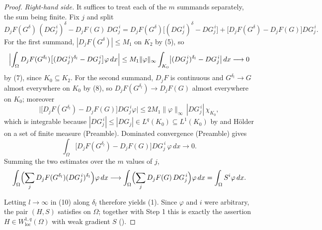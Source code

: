 \begin{proof}
\emph{Right-hand side.}  It suffices to treat each of the $m$ summands
separately, the sum being finite.  Fix $j$ and split
\[
D_jF(G^{\delta})\,(DG_j^{\,i})^{\delta}-D_jF(G)\,DG_j^{\,i}
=D_jF(G^{\delta})\bigl[(DG_j^{\,i})^{\delta}-DG_j^{\,i}\bigr]
+\bigl[D_jF(G^{\delta})-D_jF(G)\bigr]DG_j^{\,i} .
\]
For the first summand, $|D_jF(G^{\delta})|\le M_1$ on $K_2$ by (5), so
\[
\Bigl|\int_\Omega D_jF(G^{\delta_l})\bigl[(DG_j^{\,i})^{\delta_l}-DG_j^{\,i}\bigr]\varphi\,dx\Bigr|
\le M_1\|\varphi\|_\infty\int_{K_0}\bigl|(DG_j^{\,i})^{\delta_l}-DG_j^{\,i}\bigr|\,dx
\longrightarrow0
\]
by (7), since $K_0\subseteq K_2$.  For the second summand, $D_jF$ is continuous
and $G^{\delta_l}\to G$ almost everywhere on $K_0$ by (8), so
$D_jF(G^{\delta_l})\to D_jF(G)$ almost everywhere on $K_0$; moreover
\[
\bigl|\bigl[D_jF(G^{\delta_l})-D_jF(G)\bigr]DG_j^{\,i}\varphi\bigr|
\le2M_1\|\varphi\|_\infty\,|DG_j^{\,i}|\,\chi_{K_0},
\]
which is integrable because $|DG_j^{\,i}|\le|DG_j|\in L^q(K_0)\subseteq
L^1(K_0)$ by  and H\"older on a set of finite measure
(Preamble).  Dominated convergence (Preamble) gives
\[
\int_\Omega\bigl[D_jF(G^{\delta_l})-D_jF(G)\bigr]DG_j^{\,i}\,\varphi\,dx
\longrightarrow0 .
\]
Summing the two estimates over the $m$ values of $j$,
\[
\int_\Omega\Bigl(\sum_jD_jF(G^{\delta_l})(DG_j^{\,i})^{\delta_l}\Bigr)\varphi\,dx
\longrightarrow
\int_\Omega\Bigl(\sum_jD_jF(G)\,DG_j^{\,i}\Bigr)\varphi\,dx
=\int_\Omega S^i\varphi\,dx .
\]

Letting $l\to\infty$ in (10) along $\delta_l$ therefore yields (1).  Since
$\varphi$ and $i$ were arbitrary, the pair $(H,S)$ satisfies
 on $\Omega$; together with Step 1 this is exactly
the assertion $H\in W^{1,q}_{\mathrm{loc}}(\Omega)$ with weak gradient $S$
().
\end{proof}
